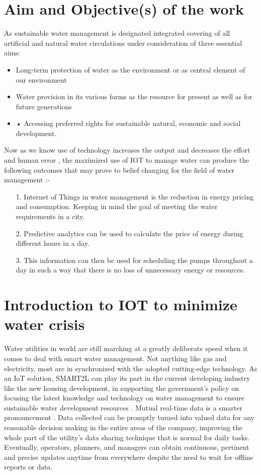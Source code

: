 \documentclass[12pt,times,a4paper]{report}
\begin{document}
{{\begin{normalsize}
\section{Aim and Objective(s) of the work}
As sustainable water management is designated integrated covering of all artificial and natural water circulations under consideration of three essential aims:
\begin{itemize}
    \item  Long-term protection of water as the environment or as central element of our environment
    \item Water provision in its various forms as the resource for present as well as for future generations
    \item •	Accessing preferred rights for sustainable natural, economic and social development.
\end{itemize}
Now as we know use of technology increases the output and decreases the effort and human error , the maximized use of IOT to manage water can produce the following outcomes that may prove to belief changing for the field of water management :-
\begin{itemize}
    \item[1.]Internet of Things in water management is the reduction in energy pricing and consumption. Keeping in mind the goal of meeting the water requirements in a city.
    \item[2.]Predictive analytics can be used to calculate the price of energy during different hours in a day.
    \item[3.]This information can then be used for scheduling the pumps throughout a day in such a way that there is no loss of unnecessary energy or resources.
\end{itemize}
\newpage
\section{Introduction to IOT to minimize water crisis }
Water utilities in world are still marching at a greatly deliberate speed when it comes to deal with smart water management. Not anything like gas and electricity, most are in synchronized with the adopted cutting-edge technology. As an IoT solution, SMART2L can play its part in the current developing industry like the new housing development, in supporting the government’s policy on focusing the latest knowledge and technology on water management to ensure sustainable water development resources .  
Mutual real-time data is a smarter pronouncement . Data collected can be promptly turned into valued data for any reasonable decision making in the entire areas of the company, improving the whole part of the utility's data sharing technique that is normal for daily tasks. Eventually, operators, planners, and managers can obtain continuous, pertinent and precise updates anytime from everywhere despite the need to wait for offline reports or data. 

\end{normalsize}}}
\end{document}
